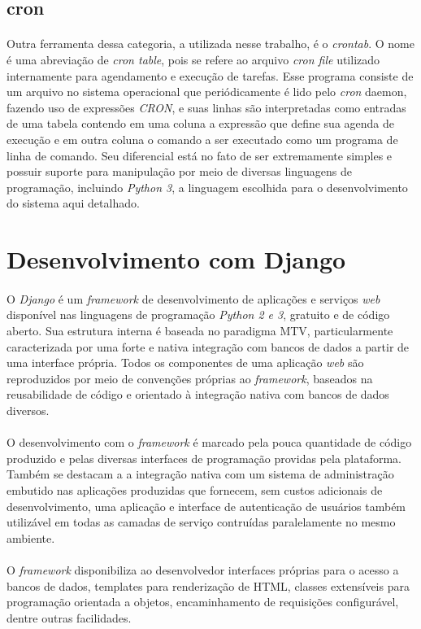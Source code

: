 \subsection{cron}

\paragraph{}Outra ferramenta dessa categoria, a utilizada nesse trabalho, é o \textit{crontab}. O nome é uma abreviação de \textit{cron table}, pois se refere ao arquivo \textit{cron file} utilizado internamente para agendamento e execução de tarefas. Esse programa consiste de um arquivo no sistema operacional que periódicamente é lido pelo \textit{cron} daemon, fazendo uso de expressões \textit{CRON}, e suas linhas são interpretadas como entradas de uma tabela contendo em uma coluna a expressão que define sua agenda de execução e em outra coluna o comando a ser executado como um programa de linha de comando. Seu diferencial está no fato de ser extremamente simples e possuir suporte para manipulação por meio de diversas linguagens de programação, incluindo \textit{Python 3}, a linguagem escolhida para o desenvolvimento do sistema aqui detalhado.

\section{Desenvolvimento com Django}

\paragraph{}O \textit{Django} \cite{Django} é um \textit{framework} de desenvolvimento de aplicações e serviços \textit{web} disponível nas linguagens de programação \textit{Python 2 e 3}, gratuito e de código aberto. Sua estrutura interna é baseada no paradigma MTV, particularmente caracterizada por uma forte e nativa integração com bancos de dados a partir de uma interface própria. Todos os componentes de uma aplicação \textit{web} são reproduzidos por meio de convenções próprias ao \textit{framework}, baseados na reusabilidade de código e orientado à integração nativa com bancos de dados diversos.

\paragraph{}O desenvolvimento com o \textit{framework} é marcado pela pouca quantidade de código produzido e pelas diversas interfaces de programação providas pela plataforma. Também se destacam a a integração nativa com um sistema de administração embutido nas aplicações produzidas que fornecem, sem custos adicionais de desenvolvimento, uma aplicação e interface de autenticação de usuários também utilizável em todas as camadas de serviço contruídas paralelamente no mesmo ambiente.

\paragraph{}O \textit{framework} disponibiliza ao desenvolvedor interfaces próprias para o acesso a bancos de dados, templates para renderização de HTML, classes extensíveis para programação orientada a objetos, encaminhamento de requisições configurável, dentre outras facilidades.
